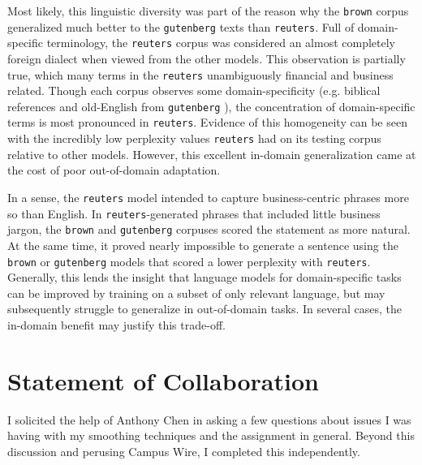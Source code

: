 \documentclass[11pt,a4paper]{article}
\begin{document}
Most likely, this linguistic diversity was part of the reason why the \texttt{brown} corpus generalized much better to the \texttt{gutenberg} texts than \texttt{reuters}. Full of domain-specific terminology, the \texttt{reuters} corpus was considered an almost completely foreign dialect when viewed from the other models. This observation is partially true, which many terms in the \texttt{reuters} unambiguously financial and business related. Though each corpus observes some domain-specificity (e.g. biblical references and old-English from \texttt{gutenberg} ), the concentration of domain-specific terms is most pronounced in \texttt{reuters}. Evidence of this homogeneity can be seen with the incredibly low perplexity values \texttt{reuters} had on its testing corpus relative to other models. However, this excellent in-domain generalization came at the cost of poor out-of-domain adaptation. 

In a sense, the \texttt{reuters} model intended to capture business-centric phrases more so than English. In \texttt{reuters}-generated phrases that included little business jargon, the \texttt{brown} and \texttt{gutenberg} corpuses scored the statement as more natural. At the same time, it proved nearly impossible to generate a sentence using the \texttt{brown} or \texttt{gutenberg} models that scored a lower perplexity with \texttt{reuters}. Generally, this lends the insight that language models for domain-specific tasks can be improved by training on a subset of only relevant language, but may subsequently struggle to generalize in out-of-domain tasks. In several cases, the in-domain benefit may justify this trade-off.







\section{Statement of Collaboration}

I solicited the help of Anthony Chen in asking a few questions about issues I was having with 
my smoothing techniques and the assignment in general. Beyond this discussion and perusing 
Campus Wire, I completed this independently.

\end{document}
